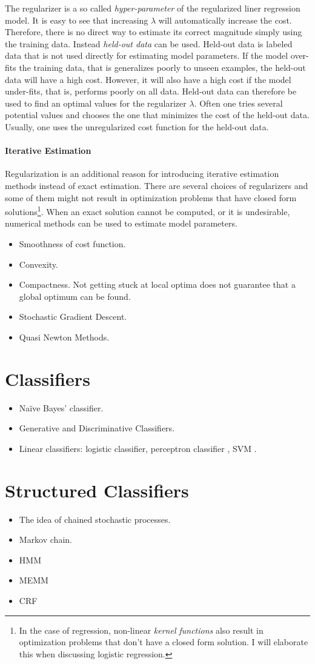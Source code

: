 The regularizer is a so called {\it hyper-parameter} of the
regularized liner regression model. It is easy to see that increasing
$\lambda$ will automatically increase the cost. Therefore, there is no
direct way to estimate its correct magnitude simply using the training
data. Instead {\it held-out data} can be used. Held-out data is
labeled data that is not used directly for estimating model
parameters. If the model over-fits the training data, that is
generalizes poorly to unseen examples, the held-out data will have a
high cost. However, it will also have a high cost if the model
under-fits, that is, performs poorly on all data. Held-out data can
therefore be used to find an optimal values for the regularizer
$\lambda$. Often one tries several potential values and chooses the
one that minimizes the cost of the held-out data. Usually, one uses
the unregularized cost function for the held-out data.

\paragraph{Iterative Estimation} Regularization is an additional reason for
introducing iterative estimation methods instead of exact
estimation. There are several choices of regularizers and some of them
might not result in optimization problems that have closed form
solutions\footnote{In the case of regression, non-linear {\it kernel
    functions} also result in optimization problems that don't have a
  closed form solution. I will elaborate this when discussing logistic
  regression.}. When an exact solution cannot be computed, or it is
undesirable, numerical methods can be used to estimate model
parameters.

\begin{itemize}
\item Smoothness of cost function.
\item Convexity.
\item Compactness. Not getting stuck at local optima does not
  guarantee that a global optimum can be found.
\item Stochastic Gradient Descent.
\item Quasi Newton Methods.
\end{itemize}

\section{Classifiers}
\begin{itemize}
\item Naïve Bayes' classifier.
\item Generative and Discriminative Classifiers.
\item Linear classifiers: logistic classifier, perceptron classifier \citep{Freund1999},
  SVM \citep{Cortes1995}.
\end{itemize}

\section{Structured Classifiers}
\begin{itemize}
\item The idea of chained stochastic processes.
\item Markov chain.
\item HMM
\item MEMM
\item CRF
\end{itemize}
